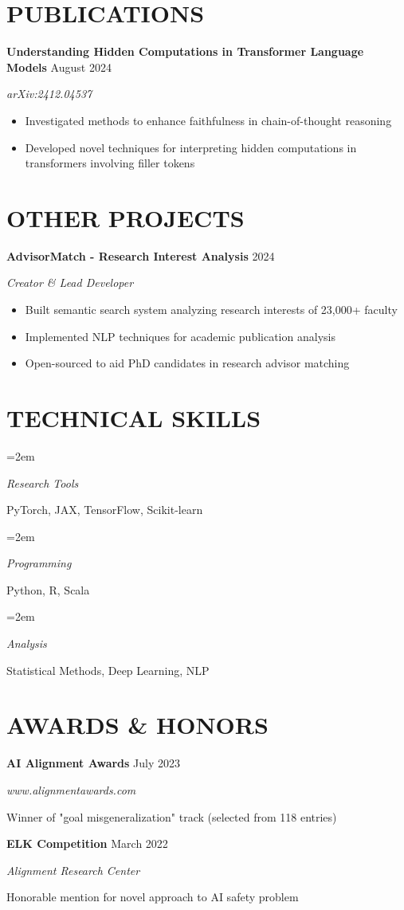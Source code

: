 \documentclass[fontsize=11pt]{article}
\newlength{\spacebox}
\newcommand{\NewPart}[1]{\section*{\uppercase{#1}}}
\newcommand{\PersonalEntry}[2]{
    \noindent\hangindent=2em\hangafter=0
    \parbox{\spacebox}{\textit{#1}}
    \hspace{1.5em} #2 \par}
\newcommand{\ProjectEntry}[4]{
    \noindent \textbf{#1} \hfill {#2} \par
    \noindent \textit{#3} \par
    \noindent \small #4
    \normalsize \par}
\begin{document}
\NewPart{Publications}
\ProjectEntry
{Understanding Hidden Computations in Transformer Language Models}
{August 2024}
{arXiv:2412.04537}
{
\begin{itemize}
\item Investigated methods to enhance faithfulness in chain-of-thought reasoning
\item Developed novel techniques for interpreting hidden computations in transformers involving filler tokens
\end{itemize}}

\NewPart{Other Projects}
\ProjectEntry
{AdvisorMatch - Research Interest Analysis}
{2024}
{Creator \& Lead Developer}
{
\begin{itemize}
\item Built semantic search system analyzing research interests of 23,000+ faculty
\item Implemented NLP techniques for academic publication analysis
\item Open-sourced to aid PhD candidates in research advisor matching
\end{itemize}}

\NewPart{Technical Skills}
\PersonalEntry{Research Tools}{PyTorch, JAX, TensorFlow, Scikit-learn}
\PersonalEntry{Programming}{Python, R, Scala}
\PersonalEntry{Analysis}{Statistical Methods, Deep Learning, NLP}

\NewPart{Awards \& Honors}
\ProjectEntry
{AI Alignment Awards}
{July 2023}
{www.alignmentawards.com}
{Winner of "goal misgeneralization" track (selected from 118 entries)}

\ProjectEntry
{ELK Competition}
{March 2022}
{Alignment Research Center}
{Honorable mention for novel approach to AI safety problem}
\end{document}
